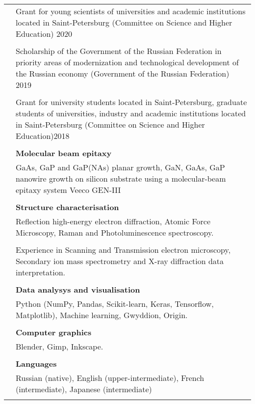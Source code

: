 \documentclass[letterpaper, 11pt]{article}
\begin{document}
\begin{longtable}{p{1.3in}p{4.8in}}
		{\color{OliveGreen}{Honors and scholarships}}
        & Grant for young scientists of universities and academic institutions
        located in Saint-Petersburg (Committee on Science and Higher Education)
        \hfill 2020\\
		& \\
        & Scholarship of the Government of the Russian Federation in priority
        areas of modernization and technological development of the Russian
        economy (Government of the Russian Federation) \hfill 2019\\
		& \\
        & Grant for university students located in Saint-Petersburg, graduate
        students of universities, industry and academic institutions located in
        Saint-Petersburg (Committee on Science and Higher Education)\hfill 2018
        \\
		& \\
		
		
		{\color{OliveGreen}{Skills}}
		& \textbf{Molecular beam epitaxy} \\
        & GaAs, GaP and GaP(NAs) planar growth, GaN, GaAs, GaP nanowire growth
        on silicon substrate using a molecular-beam epitaxy system Veeco
        GEN-III \\
		& \\
		& \textbf{Structure characterisation} \\
        & Reflection high-energy electron diffraction, Atomic Force Microscopy,
        Raman and Photoluminescence spectroscopy. \\
		& \\
        & Experience in Scanning and Transmission electron microscopy,
        Secondary ion mass spectrometry and X-ray  diffraction data
        interpretation. \\
		& \\
		& \textbf{Data analysys and visualisation} \\
        & Python (NumPy, Pandas, Scikit-learn, Keras, Tensorflow, Matplotlib),
        Machine learning, Gwyddion, Origin. \\
        \\
		& \textbf{Computer graphics} \\
        & Blender, Gimp, Inkscape. \\ 
		& \\
		& \textbf{Languages} \\
        & Russian (native), English (upper-intermediate), French
        (intermediate), Japanese (intermediate) \\
		& \\
		

\end{longtable}
\end{document}
